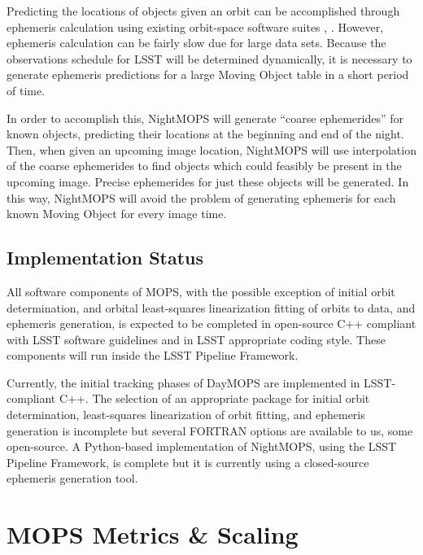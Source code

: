 \documentclass[12pt,preprint]{aastex}
\begin{document}
Predicting the locations of objects given an orbit can be accomplished
through ephemeris calculation using existing orbit-space software
suites \citep{Milani2006}, \citep{OpenOrb2009}.  However, ephemeris
calculation can be fairly slow due for large data sets.  Because the
observations schedule for LSST will be determined dynamically, it is
necessary to generate ephemeris predictions for a large Moving Object
table in a short period of time.


In order to accomplish this, NightMOPS will generate ``coarse
ephemerides'' for known objects, predicting their locations at the
beginning and end of the night.  Then, when given an upcoming image
location, NightMOPS will use interpolation of the coarse ephemerides
to find objects which could feasibly be present in the upcoming
image. Precise ephemerides for just these objects will be
generated. In this way, NightMOPS will avoid the problem of generating
ephemeris for each known Moving Object for every image time.


\subsection{Implementation Status}

All software components of MOPS, with the possible exception of
initial orbit determination, and orbital least-squares linearization
fitting of orbits to data, and ephemeris generation, is expected to be
completed in open-source C++ compliant with LSST software guidelines
and in LSST appropriate coding style.  These components will run
inside the LSST Pipeline Framework.  

Currently, the initial tracking phases of DayMOPS are implemented in
LSST-compliant C++.  The selection of an appropriate package for
initial orbit determination, least-squares linearization of orbit
fitting, and ephemeris generation is incomplete but several FORTRAN
options are available to us, some open-source.  A Python-based
implementation of NightMOPS, using the LSST Pipeline Framework, is
complete but it is currently using a closed-source ephemeris
generation tool.




\section{MOPS Metrics \& Scaling}
\end{document}
